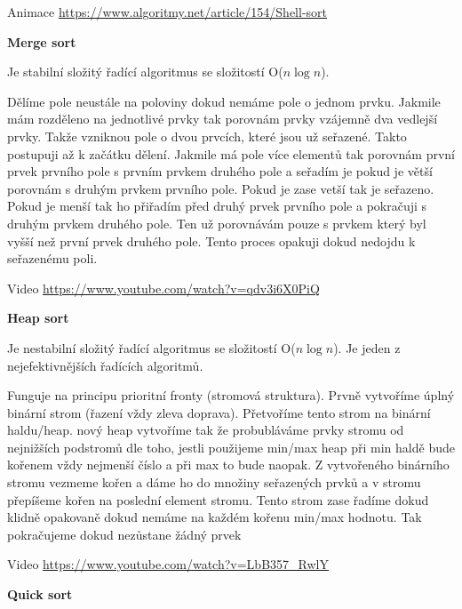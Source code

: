 Animace \url{https://www.algoritmy.net/article/154/Shell-sort}

\begin{Large}\vspace{0,5cm} \textbf{Merge sort}
\end{Large}

Je stabilní složitý řadící algoritmus se složitostí O($n\log{n}$).

Dělíme pole neustále na poloviny dokud nemáme pole o jednom prvku. Jakmile mám rozděleno na jednotlivé prvky tak porovnám prvky vzájemně dva vedlejší prvky. Takže vzniknou pole o dvou prvcích, které jsou už seřazené. Takto postupuji až k začátku dělení. Jakmile má pole více elementů tak porovnám první prvek prvního pole s prvním prvkem druhého pole a seřadím je pokud je větší porovnám s druhým prvkem prvního pole. Pokud je zase vetší tak je seřazeno. Pokud je menší tak ho přiřadím před druhý prvek prvního pole a pokračuji s druhým prvkem druhého pole. Ten už porovnávám pouze s prvkem který byl vyšší než první prvek druhého pole. Tento proces opakuji dokud nedojdu k seřazenému poli.

Video \url{https://www.youtube.com/watch?v=qdv3i6X0PiQ}

\begin{Large}\vspace{0,5cm} \textbf{Heap sort}
\end{Large}

Je nestabilní složitý řadící algoritmus se složitostí O($n\log{n}$). Je jeden z nejefektivnějších řadících algoritmů.

Funguje na principu prioritní fronty (stromová struktura). Prvně vytvoříme úplný binární strom (řazení vždy zleva doprava). Přetvoříme tento strom na binární haldu/heap. nový heap vytvoříme tak že probubláváme prvky stromu od nejnižších podstromů dle toho, jestli použijeme min/max heap při min haldě bude kořenem vždy nejmenší číslo a při max to bude naopak. Z vytvořeného binárního stromu vezmeme kořen a dáme ho do množiny seřazených prvků a v stromu přepíšeme kořen na poslední element stromu. Tento strom zase řadíme dokud klidně opakovaně dokud nemáme na každém kořenu min/max hodnotu. Tak pokračujeme dokud nezůstane žádný prvek

Video \url{https://www.youtube.com/watch?v=LbB357_RwlY}

\begin{Large}\vspace{0,5cm} \textbf{Quick sort}
\end{Large}

